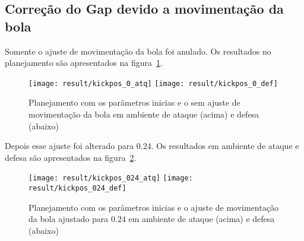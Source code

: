 \subsection{Correção do Gap devido a movimentação da bola}

Somente o ajuste de movimentação da bola foi anulado. Os resultados
no planejamento são apresentados na figura~\ref{fig:kickpos_0}.

\begin{figure}[H]
  \centering
  \texttt{[image: result/kickpos\_0\_atq]}
  \texttt{[image: result/kickpos\_0\_def]}
  \caption{Planejamento com os parâmetros inicias e o sem ajuste
           de movimentação da bola em ambiente de
           ataque (acima) e defesa (abaixo)}\label{fig:kickpos_0}
\end{figure}

Depois esse ajuste foi alterado para $0.24$. Os resultados 
em ambiente de ataque e defesa são apresentados na
figura~\ref{fig:kickpos_024}.

\begin{figure}[H]
  \centering
  \texttt{[image: result/kickpos\_024\_atq]}
  \texttt{[image: result/kickpos\_024\_def]}
  \caption{Planejamento com os parâmetros inicias e o ajuste de
           movimentação da bola ajustado para $0.24$ em ambiente de
           ataque (acima) e defesa (abaixo)}\label{fig:kickpos_024}
\end{figure}
